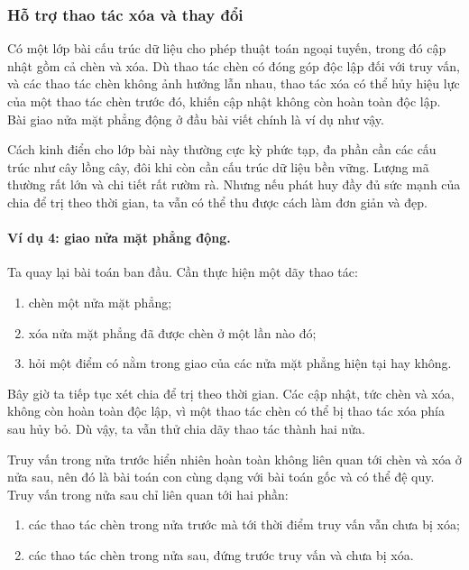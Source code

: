 \documentclass[11pt]{article}
\begin{document}
\subsubsection{Hỗ trợ thao tác xóa và thay đổi}

Có một lớp bài cấu trúc dữ liệu cho phép thuật toán ngoại tuyến, trong đó
cập nhật gồm cả chèn và xóa. Dù thao tác chèn có đóng góp độc lập đối với
truy vấn, và các thao tác chèn không ảnh hưởng lẫn nhau, thao tác xóa có thể
hủy hiệu lực của một thao tác chèn trước đó, khiến cập nhật không còn hoàn
toàn độc lập. Bài giao nửa mặt phẳng động ở đầu bài viết chính là ví dụ như
vậy.

Cách kinh điển cho lớp bài này thường cực kỳ phức tạp, đa phần cần các cấu
trúc như cây lồng cây, đôi khi còn cần cấu trúc dữ liệu bền vững. Lượng mã
thường rất lớn và chi tiết rất rườm rà. Nhưng nếu phát huy đầy đủ sức mạnh
của chia để trị theo thời gian, ta vẫn có thể thu được cách làm đơn giản và
đẹp.

\paragraph{Ví dụ 4: giao nửa mặt phẳng động.}
Ta quay lại bài toán ban đầu. Cần thực hiện một dãy thao tác:
\begin{enumerate}
  \item chèn một nửa mặt phẳng;
  \item xóa nửa mặt phẳng đã được chèn ở một lần nào đó;
  \item hỏi một điểm có nằm trong giao của các nửa mặt phẳng hiện tại hay
  không.
\end{enumerate}

Bây giờ ta tiếp tục xét chia để trị theo thời gian. Các cập nhật, tức chèn
và xóa, không còn hoàn toàn độc lập, vì một thao tác chèn có thể bị thao tác
xóa phía sau hủy bỏ. Dù vậy, ta vẫn thử chia dãy thao tác thành hai nửa.

Truy vấn trong nửa trước hiển nhiên hoàn toàn không liên quan tới chèn và
xóa ở nửa sau, nên đó là bài toán con cùng dạng với bài toán gốc và có thể
đệ quy. Truy vấn trong nửa sau chỉ liên quan tới hai phần:
\begin{enumerate}
  \item các thao tác chèn trong nửa trước mà tới thời điểm truy vấn vẫn chưa
  bị xóa;
  \item các thao tác chèn trong nửa sau, đứng trước truy vấn và chưa bị xóa.
\end{enumerate}
\end{document}
